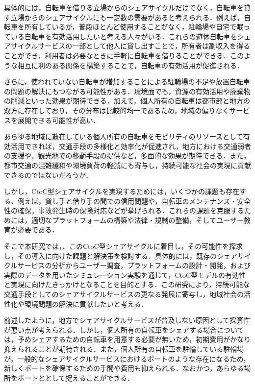       \par 具体的には，自転車を借りる立場からのシェアサイクルだけでなく，自転車を貸す立場からのシェアサイクルにも一定数の需要があると考えられる．例えば，自転車を所有しているが，普段ほとんど使用することがなく，駐輪場や自宅で眠っている自転車を有効活用したいと考える人々がいる．これらの遊休自転車をシェアサイクルサービスの一部として他人に貸し出すことで，所有者は副収入を得ることができ，利用者は必要なときに手軽に自転車を借りることができる．このような相互に利のある関係を構築することで，自転車の有効活用が促進される．
       \par さらに，使われていない自転車が増加することによる駐輪場の不足や放置自転車の問題の解決にもつながる可能性がある．環境面でも，資源の有効活用や廃棄物の削減といった効果が期待できる．加えて，個人所有の自転車は都市部と地方の双方に存在しており，その分布は比較的均一であるため，地域の偏りなくサービスを展開できる可能性が高い．
        \par あらゆる地域に散在している個人所有の自転車をモビリティのリソースとして有効活用できれば，交通手段の多様化と効率化が促進され，地方における交通弱者の支援や，観光地での移動手段の提供など，多面的な効果が期待できる．また，都市交通の混雑緩和や環境負荷の軽減にも寄与し，持続可能な社会の実現に貢献できるのではないだろうか．
        \par しかし，CtoC型シェアサイクルを実現するためには，いくつかの課題も存在する．例えば，貸し手と借り手の間での信用問題や，自転車のメンテナンス・安全性の確保，事故発生時の保険対応などが挙げられる．これらの課題を克服するためには，適切なプラットフォームの構築や法律・規制の整備，そしてユーザー教育が必要である．
        \par そこで本研究では，、このCtoC型シェアサイクルに着目し，その可能性を探求し，その導入に向けた課題と解決策を検討する．具体的には，既存のシェアサイクルサービスの分析からユーザー調査，プラットフォームの設計・開発，および実際のデータを用いたシミュレーション実験を通じて，CtoC型モデルの有効性と実現に向けたきっかけとなることを目的とする．この研究により，持続可能な交通手段としてのシェアサイクルサービスの更なる発展に寄与し，地域社会の活性化や環境問題の解決に貢献したいと考える．
        \par 前述したように，地方でシェアサイクルサービスが普及しない原因として採算性が悪い点が考えられる．しかし，個人所有の自転車をシェアする場合については，予めシェアするための自転車を用意する必要が無いため，初期費用がかなり抑えられることが期待される．また，個人所有の自転車を駐輪している駐輪場が，一般的なシェアサイクルサービスにおけるポートのような存在になるため，新しくポートを確保するための手間や費用も抑えられる．なおかつ，あらゆる場所をポートととして捉えることができる．
